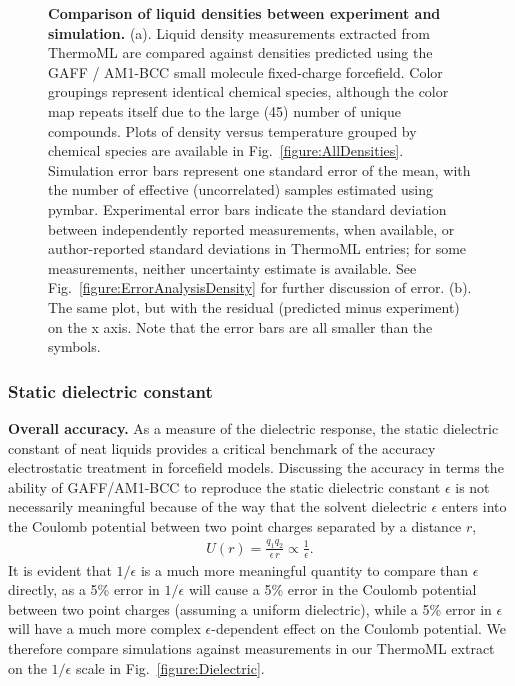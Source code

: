 \documentclass[aps,pre,twocolumn,nofootinbib,superscriptaddress,linenumbers]{revtex4-1}
\begin{document}
\begin{figure}



\caption{{\bf Comparison of liquid densities between experiment and simulation.}
(a).  Liquid density measurements extracted from ThermoML are compared against densities predicted using the GAFF / AM1-BCC small molecule fixed-charge forcefield.
Color groupings represent identical chemical species, although the color map repeats itself due to the large (45) number of unique compounds.
Plots of density versus temperature grouped by chemical species are available in Fig.~\ref{figure:AllDensities}.
Simulation error bars represent one standard error of the mean, with the number of effective (uncorrelated) samples estimated using pymbar.  
Experimental error bars indicate the standard deviation between independently reported measurements, when available, or author-reported standard deviations in ThermoML entries; for some measurements, neither uncertainty estimate is available.  
See Fig.~\ref{figure:ErrorAnalysisDensity} for further discussion of error.  (b).  The same plot, but with the residual (predicted minus experiment) on the x axis.  Note that the error bars are all smaller than the symbols.  
}
\label{figure:Density}
\end{figure}


\subsubsection{Static dielectric constant}
\label{section:results:static-dielectric-constant}

{\bf Overall accuracy.}
As a measure of the dielectric response, the static dielectric constant of neat liquids provides a critical benchmark of the accuracy electrostatic treatment in forcefield models.  
Discussing the accuracy in terms the ability of GAFF/AM1-BCC to reproduce the static dielectric constant $\epsilon$ is not necessarily meaningful because of the way that the solvent dielectric $\epsilon$ enters into the Coulomb potential between two point charges separated by a distance $r$,
\begin{eqnarray}
U(r) = \frac{q_1 q_2}{\epsilon \, r} \propto \frac{1}{\epsilon} .
\end{eqnarray}
It is evident that $1/\epsilon$ is a much more meaningful quantity to compare than $\epsilon$ directly, as a 5\% error in $1/\epsilon$ will cause a 5\% error in the Coulomb potential between two point charges (assuming a uniform dielectric), while a 5\% error in $\epsilon$ will have a much more complex $\epsilon$-dependent effect on the Coulomb potential.
We therefore compare simulations against measurements in our ThermoML extract on the $1/\epsilon$ scale in Fig.~\ref{figure:Dielectric}.  
\end{document}
